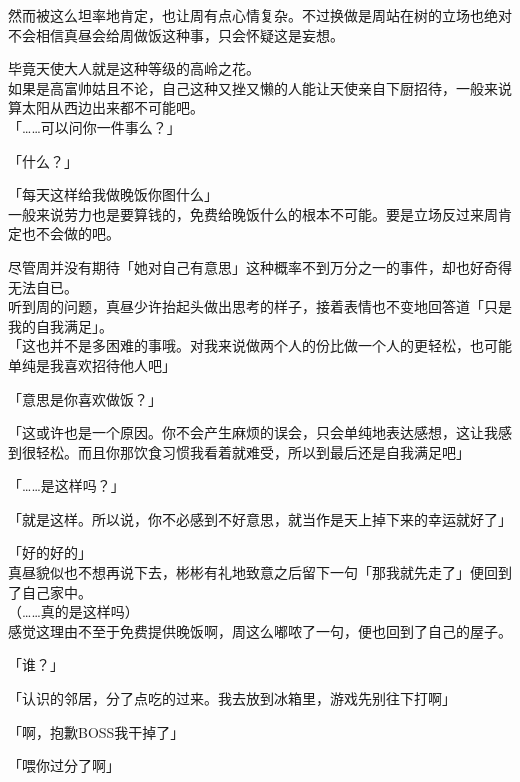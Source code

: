 然而被这么坦率地肯定，也让周有点心情复杂。不过换做是周站在树的立场也绝对不会相信真昼会给周做饭这种事，只会怀疑这是妄想。

毕竟天使大人就是这种等级的高岭之花。\\

如果是高富帅姑且不论，自己这种又挫又懒的人能让天使亲自下厨招待，一般来说算太阳从西边出来都不可能吧。\\

「……可以问你一件事么？」

「什么？」

「每天这样给我做晚饭你图什么」\\

一般来说劳力也是要算钱的，免费给晚饭什么的根本不可能。要是立场反过来周肯定也不会做的吧。

尽管周并没有期待「她对自己有意思」这种概率不到万分之一的事件，却也好奇得无法自已。\\

听到周的问题，真昼少许抬起头做出思考的样子，接着表情也不变地回答道「只是我的自我满足」。\\

「这也并不是多困难的事哦。对我来说做两个人的份比做一个人的更轻松，也可能单纯是我喜欢招待他人吧」

「意思是你喜欢做饭？」

「这或许也是一个原因。你不会产生麻烦的误会，只会单纯地表达感想，这让我感到很轻松。而且你那饮食习惯我看着就难受，所以到最后还是自我满足吧」

「……是这样吗？」

「就是这样。所以说，你不必感到不好意思，就当作是天上掉下来的幸运就好了」

「好的好的」\\

真昼貌似也不想再说下去，彬彬有礼地致意之后留下一句「那我就先走了」便回到了自己家中。\\

（……真的是这样吗）\\

感觉这理由不至于免费提供晚饭啊，周这么嘟哝了一句，便也回到了自己的屋子。\\

\vspace{2\baselineskip}

「谁？」

「认识的邻居，分了点吃的过来。我去放到冰箱里，游戏先别往下打啊」

「啊，抱歉BOSS我干掉了」

「喂你过分了啊」
